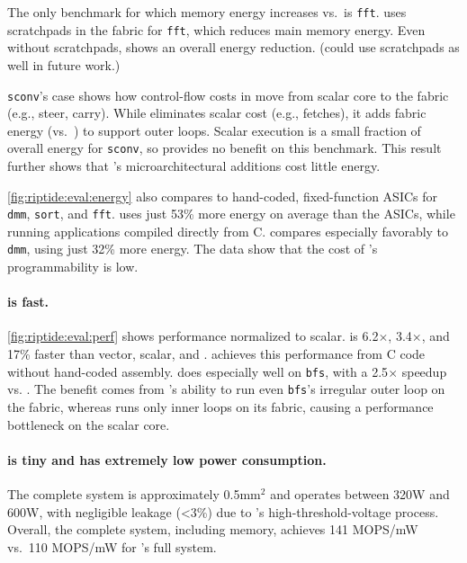 The only benchmark for which memory energy increases vs.\ \snafu is {\tt fft}.
% 
\snafu uses scratchpads in the fabric for {\tt fft}, which reduces main memory energy.
% 
Even without scratchpads, \riptide shows an overall energy reduction.
(\riptide could use scratchpads as well in future work.)

{\tt sconv}'s case shows how control-flow costs in \riptide move from scalar core to the
fabric (e.g., steer, carry).
% 
While \riptide eliminates scalar cost (e.g., fetches), it adds fabric energy (vs.\
\snafu) to support outer loops.
% 
Scalar execution is a small fraction of overall energy for {\tt sconv},
so \riptide provides no benefit on this benchmark.
%
This result further shows that \riptide's microarchitectural additions cost little energy.


\autoref{fig:riptide:eval:energy} also compares \riptide to hand-coded, fixed-function
ASICs for {\tt dmm}, {\tt sort}, and {\tt fft}.
% 
\riptide uses just 53\% more energy on average than the ASICs, while running
applications compiled directly from C. %
% 
\riptide compares especially favorably to {\tt dmm}, using just 32\% more energy.
% 
The data show that the cost of \riptide's programmability is low.

\paragraph{\riptide is fast.}
\autoref{fig:riptide:eval:perf} shows performance normalized to scalar.
%
\riptide is 6.2$\times$, 3.4$\times$, and 17\% faster than vector, scalar, and \snafu.
%
\riptide achieves this performance from C code without hand-coded assembly.
% 
\riptide does especially well on {\tt bfs}, with a 2.5$\times$ speedup vs. \snafu. The benefit comes
from \riptide's ability to run even {\tt bfs}'s irregular outer loop on the fabric, whereas
% 
\snafu runs only inner loops on its fabric, causing a performance
bottleneck on the scalar core. %

\paragraph{\riptide is tiny and has extremely low power consumption.}
%
The complete \riptide system is approximately 0.5mm$^2$ and operates between
320\textmu W and 600\textmu W, with negligible leakage (<3\%) due to \riptide's high-threshold-voltage process.
% 
Overall, the complete system, including memory, achieves 141 MOPS/mW vs.\ 110 
MOPS/mW for \snafu's full system.

